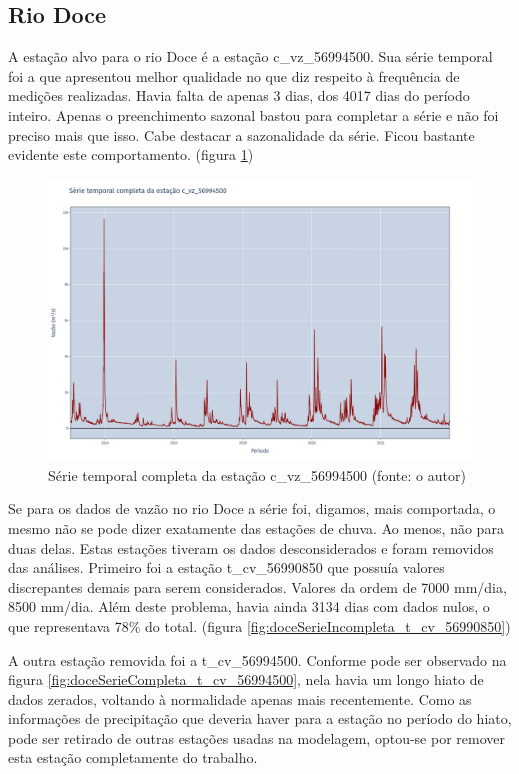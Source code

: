 \subsection{Rio Doce}

A estação alvo para o rio Doce é a estação c\_vz\_56994500. Sua série temporal foi a que apresentou melhor qualidade no que diz respeito à frequência de medições realizadas. Havia falta de apenas 3 dias, dos 4017 dias do período inteiro. Apenas o preenchimento sazonal bastou para completar a série e não foi preciso mais que isso. Cabe destacar a sazonalidade da série. Ficou bastante evidente este comportamento. (figura \ref{fig:doceSerieCompleta_c_vz_56994500})

\begin{figure}[!h]
\centering
\includegraphics[scale=0.25]{Figuras/rio_doce/doceSerieCompleta_c_vz_56994500.png}
\caption{Série temporal completa da estação c\_vz\_56994500 (fonte: o autor)}
\label{fig:doceSerieCompleta_c_vz_56994500}
\end{figure}

Se para os dados de vazão no rio Doce a série foi, digamos, mais comportada, o mesmo não se pode dizer exatamente das estações de chuva. Ao menos, não para duas delas. Estas estações tiveram os dados desconsiderados e foram removidos das análises. Primeiro foi a estação t\_cv\_56990850 que possuía valores discrepantes demais para serem considerados. Valores da ordem de 7000 mm/dia, 8500 mm/dia. Além deste problema, havia ainda 3134 dias com dados nulos, o que representava 78\% do total. (figura \ref{fig:doceSerieIncompleta_t_cv_56990850})

A outra estação removida foi a t\_cv\_56994500. Conforme pode ser observado na figura \ref{fig:doceSerieCompleta_t_cv_56994500}, nela havia um longo hiato de dados zerados, voltando à normalidade apenas mais recentemente. Como as informações de precipitação que deveria haver para a estação no período do hiato, pode ser retirado de outras estações usadas na modelagem, optou-se por remover esta estação completamente do trabalho.

